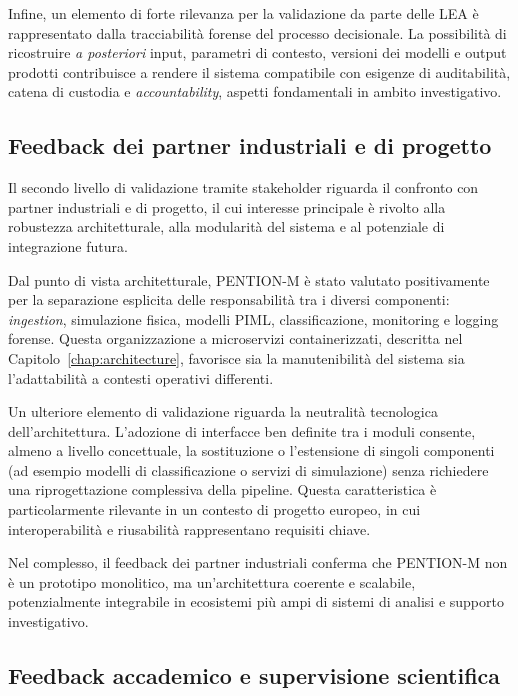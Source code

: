 Infine, un elemento di forte rilevanza per la validazione da parte delle LEA è rappresentato dalla tracciabilità forense del processo decisionale.
La possibilità di ricostruire \textit{a posteriori} input, parametri di contesto, versioni dei modelli e output prodotti contribuisce a rendere il sistema compatibile con esigenze di auditabilità, catena di custodia e \textit{accountability}, aspetti fondamentali in ambito investigativo.

\subsection{Feedback dei partner industriali e di progetto}
\label{subsec:validation_industry}

Il secondo livello di validazione tramite stakeholder riguarda il confronto con partner industriali e di progetto, il cui interesse principale è rivolto alla robustezza architetturale, alla modularità del sistema e al potenziale di integrazione futura.

Dal punto di vista architetturale, PENTION-M è stato valutato positivamente per la separazione esplicita delle responsabilità tra i diversi componenti: \textit{ingestion}, simulazione fisica, modelli PIML, classificazione, monitoring e logging forense.
Questa organizzazione a microservizi containerizzati, descritta nel Capitolo~\ref{chap:architecture}, favorisce sia la manutenibilità del sistema sia l’adattabilità a contesti operativi differenti.

Un ulteriore elemento di validazione riguarda la neutralità tecnologica dell’architettura.
L’adozione di interfacce ben definite tra i moduli consente, almeno a livello concettuale, la sostituzione o l’estensione di singoli componenti (ad esempio modelli di classificazione o servizi di simulazione) senza richiedere una riprogettazione complessiva della pipeline.
Questa caratteristica è particolarmente rilevante in un contesto di progetto europeo, in cui interoperabilità e riusabilità rappresentano requisiti chiave.

Nel complesso, il feedback dei partner industriali conferma che PENTION-M non è un prototipo monolitico, ma un’architettura coerente e scalabile, potenzialmente integrabile in ecosistemi più ampi di sistemi di analisi e supporto investigativo.

\subsection{Feedback accademico e supervisione scientifica}
\label{subsec:validation_academic}

